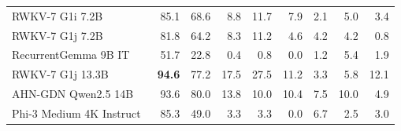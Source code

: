 {\begin{table}[!htbp]
\begin{tabularx}{\textwidth}{@{}Y r r r r r r r r @{}}
RWKV-7 G1i 7.2B~\cite{rwkvg1} & 85.1 & 68.6 & 8.8 & 11.7 & 7.9 & 2.1 & 5.0 & 3.4 \\
RWKV-7 G1j 7.2B~\cite{rwkvg1} & 81.8 & 64.2 & 8.3 & 11.2 & 4.6 & 4.2 & 4.2 & 0.8 \\
RecurrentGemma 9B IT~\cite{recurrentgemma} & 51.7 & 22.8 & 0.4 & 0.8 & 0.0 & 1.2 & 5.4 & 1.9 \\
RWKV-7 G1j 13.3B~\cite{rwkvg1} & \textbf{94.6} & 77.2 & 17.5 & 27.5 & 11.2 & 3.3 & 5.8 & 12.1 \\
AHN-GDN Qwen2.5 14B~\cite{ahn} & 93.6 & 80.0 & 13.8 & 10.0 & 10.4 & 7.5 & 10.0 & 4.9 \\
Phi-3 Medium 4K Instruct~\cite{phi3window} & 85.3 & 49.0 & 3.3 & 3.3 & 0.0 & 6.7 & 2.5 & 3.0 \\
\bottomrule
\end{tabularx}
\end{table}
}

